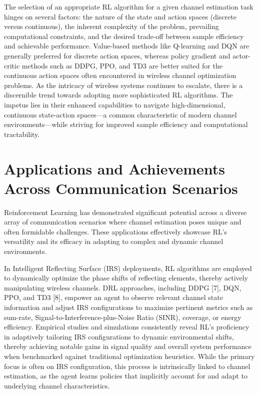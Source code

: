 \documentclass[journal,twocolumn]{IEEEtran}
\begin{document}
The selection of an appropriate RL algorithm for a given channel estimation task hinges on several factors: the nature of the state and action spaces (discrete versus continuous), the inherent complexity of the problem, prevailing computational constraints, and the desired trade-off between sample efficiency and achievable performance. Value-based methods like Q-learning and DQN are generally preferred for discrete action spaces, whereas policy gradient and actor-critic methods such as DDPG, PPO, and TD3 are better suited for the continuous action spaces often encountered in wireless channel optimization problems. As the intricacy of wireless systems continues to escalate, there is a discernible trend towards adopting more sophisticated RL algorithms. The impetus lies in their enhanced capabilities to navigate high-dimensional, continuous state-action spaces—a common characteristic of modern channel environments—while striving for improved sample efficiency and computational tractability.

\section{Applications and Achievements Across Communication Scenarios}

Reinforcement Learning has demonstrated significant potential across a diverse array of communication scenarios where channel estimation poses unique and often formidable challenges. These applications effectively showcase RL's versatility and its efficacy in adapting to complex and dynamic channel environments.

In Intelligent Reflecting Surface (IRS) deployments, RL algorithms are employed to dynamically optimize the phase shifts of reflecting elements, thereby actively manipulating wireless channels. DRL approaches, including DDPG [7], DQN, PPO, and TD3 [8], empower an agent to observe relevant channel state information and adjust IRS configurations to maximize pertinent metrics such as sum-rate, Signal-to-Interference-plus-Noise Ratio (SINR), coverage, or energy efficiency. Empirical studies and simulations consistently reveal RL's proficiency in adaptively tailoring IRS configurations to dynamic environmental shifts, thereby achieving notable gains in signal quality and overall system performance when benchmarked against traditional optimization heuristics. While the primary focus is often on IRS configuration, this process is intrinsically linked to channel estimation, as the agent learns policies that implicitly account for and adapt to underlying channel characteristics.
\end{document}
